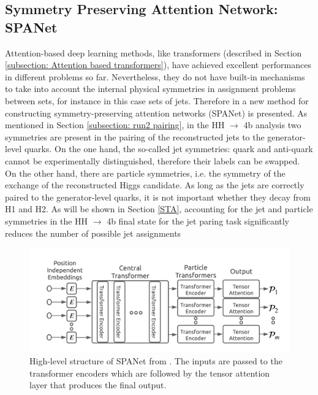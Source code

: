 \subsection{Symmetry Preserving Attention Network: SPANet} \label{subsection: SPANet}
Attention-based deep learning methods, like transformers (described in Section \ref{subsection: Attention based transformers}), have achieved excellent performances in different problems so far. Nevertheless, they do not have built-in mechanisms to take into account the internal physical symmetries in assignment problems between sets, for instance in this case sets of jets. Therefore in \cite{SPANet} a new method for constructing symmetry-preserving attention networks (SPANet) is presented. As mentioned in Section \ref{subsection: run2 pairing}, in the HH $\to$ 4b analysis two symmetries are present in the pairing of the reconstructed jets to the generator-level quarks. On the one hand, the so-called jet symmetries: quark and anti-quark cannot be experimentally distinguished, therefore their labels can be swapped. On the other hand, there are particle symmetries, i.e. the symmetry of the exchange of the reconstructed Higgs candidate. As long as the jets are correctly paired to the generator-level quarks, it is not important whether they decay from H1 and H2. As will be shown in Section \ref{STA}, accounting for the jet and particle symmetries in the HH $\to$ 4b final state for the jet paring task significantly reduces the number of possible jet assignments

\begin{figure}[hbt]
    \centering
    \includegraphics[width=0.7\linewidth]{Images/5.SPANet/SPANet structure.jpeg}
    \caption{High-level structure of SPANet from \cite{SPANet}. The inputs are passed to the transformer encoders which are followed by the tensor attention layer that produces the final output.}
    \label{fig : SPANet}
\end{figure}

